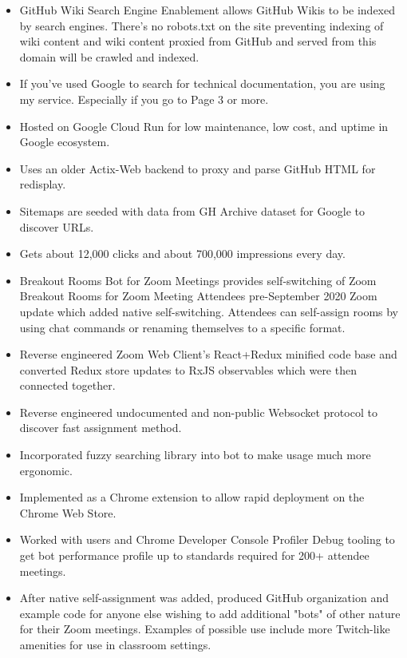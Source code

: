 \documentclass[10pt,letter,ragged2e]{altacv}
\begin{document}
\begin{paracol}{2}
\begin{itemize}
\item GitHub Wiki Search Engine Enablement allows GitHub Wikis to be indexed by search engines. There's no robots.txt on the site preventing indexing of wiki content and wiki content proxied from GitHub and served from this domain will be crawled and indexed.
\item If you've used Google to search for technical documentation, you are using my service. Especially if you go to Page 3 or more.
\item Hosted on Google Cloud Run for low maintenance, low cost, and uptime in Google ecosystem.
\item Uses an older Actix-Web backend to proxy and parse GitHub HTML for redisplay.
\item Sitemaps are seeded with data from GH Archive dataset for Google to discover URLs.
\item Gets about 12,000 clicks and about 700,000 impressions every day.
\end{itemize}


\begin{itemize}
\item Breakout Rooms Bot for Zoom Meetings provides self-switching of Zoom Breakout Rooms for Zoom Meeting Attendees pre-September 2020 Zoom update which added native self-switching. Attendees can self-assign rooms by using chat commands or renaming themselves to a specific format.
\item Reverse engineered Zoom Web Client's React+Redux minified code base and converted Redux store updates to RxJS observables which were then connected together.
\item Reverse engineered undocumented and non-public Websocket protocol to discover fast assignment method.
\item Incorporated fuzzy searching library into bot to make usage much more ergonomic.
\item Implemented as a Chrome extension to allow rapid deployment on the Chrome Web Store.
\item Worked with users and Chrome Developer Console Profiler Debug tooling to get bot performance profile up to standards required for 200+ attendee meetings.
\item After native self-assignment was added, produced GitHub organization and example code for anyone else wishing to add additional "bots" of other nature for their Zoom meetings. Examples of possible use include more Twitch-like amenities for use in classroom settings.
\end{itemize}


\end{paracol}
\end{document}

